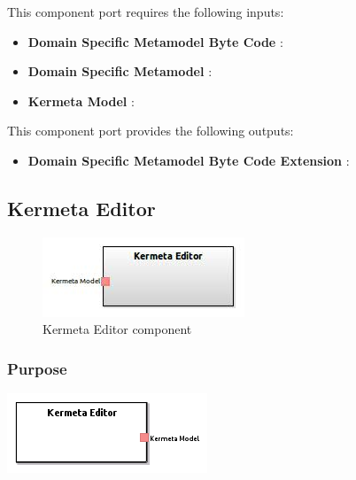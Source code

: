 \documentclass{gemoc} %
\begin{document}
This component port requires the following inputs:
\begin{itemize}
  \item \textbf{Domain Specific Metamodel Byte Code} :
  \item \textbf{Domain Specific Metamodel} :
  \item \textbf{Kermeta Model} :
\end{itemize}

This component port provides the following outputs:
\begin{itemize}
  \item \textbf{Domain Specific Metamodel Byte Code Extension} :
\end{itemize}

\subsection{Kermeta Editor}

\begin{figure}[htp]
	\begin{center}
	\includegraphics*[trim=0.0cm 0.0cm 0cm 0.0cm, clip=true, scale=1.0]{../images/generated/Generated_Kermeta Editor.jpg}
	\caption{Kermeta Editor component}
	\end{center}
\end{figure}

\subsubsection{Purpose}

\begin{center}
\includegraphics*[trim=0.0cm 0.0cm 0cm 0.0cm, clip=true]{../images/generated/Generated_Kermeta_Editor.png}
\end{center}
\end{document}
